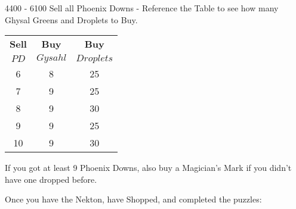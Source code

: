 \begin{shop}{4400 - 6100}
  Sell all Phoenix Downs - Reference the Table to see how many Ghysal Greens and Droplets to Buy.
  \begin{center}
    \begin{tabular}{c|c|c}
      \textbf{Sell} & \textbf{Buy} & \textbf{Buy} \\
      $PD$          & $Gysahl$     & $Droplets$   \\
      \hline
      6             & 8            & 25           \\
      7             & 9            & 25           \\
      8             & 9            & 30           \\
      9             & 9            & 25           \\
      10            & 9            & 30           \\
    \end{tabular}
  \end{center}

  If you got at least 9 Phoenix Downs, also buy a Magician's Mark if you didn't have one dropped before.
\end{shop}

Once you have the Nekton, have Shopped, and completed the puzzles:


